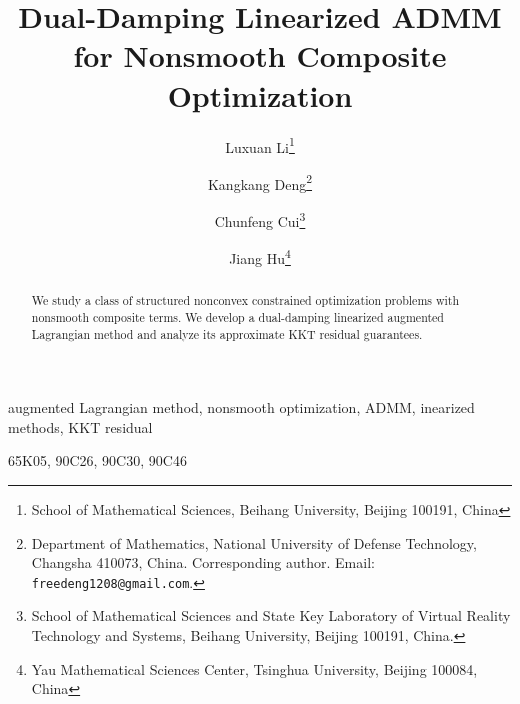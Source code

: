 \documentclass[onefignum,onetabnum]{siamart220329}
\title{{Dual-Damping Linearized ADMM for Nonsmooth Composite Optimization}}
\author{
Luxuan Li\thanks{School of Mathematical Sciences, Beihang University,
Beijing 100191, China}
\and Kangkang Deng\thanks{Department of Mathematics, National University of Defense Technology,
Changsha 410073, China. Corresponding author. Email: \texttt{freedeng1208@gmail.com}.}
\and Chunfeng Cui\thanks{School of Mathematical Sciences and State Key Laboratory of Virtual Reality Technology and Systems,
Beihang University, Beijing 100191, China.}
\and Jiang Hu\thanks{Yau Mathematical Sciences Center, Tsinghua University,
Beijing 100084, China}
}
\begin{document}
\maketitle

\begin{abstract}
We study a class of structured nonconvex constrained optimization problems
with nonsmooth composite terms.  We develop a dual-damping linearized
augmented Lagrangian method and analyze its approximate KKT residual
guarantees.
\end{abstract}

\begin{keywords}
augmented Lagrangian method, nonsmooth optimization, ADMM, inearized methods, KKT residual
\end{keywords}

\begin{AMS}
65K05, 90C26, 90C30, 90C46
\end{AMS}








\end{document}
